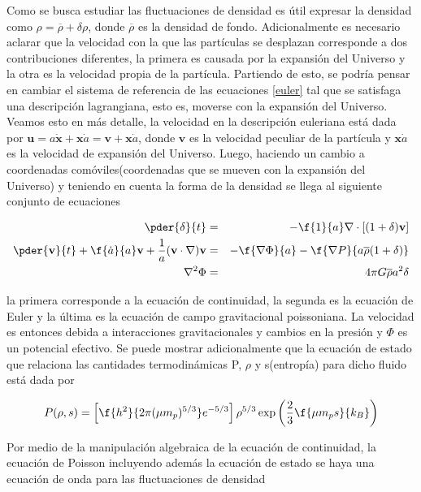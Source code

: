 Como se busca estudiar las fluctuaciones de densidad es útil expresar la 
densidad como $\rho = \overline{\rho}+\delta\rho$, donde $\overline{\rho}$
es la densidad de fondo. Adicionalmente es necesario aclarar que la velocidad 
con la que las partículas se desplazan corresponde a dos contribuciones diferentes, 
la primera es causada por la expansión del Universo y la 
otra es la velocidad propia de la partícula. Partiendo de esto, se
podría pensar en cambiar el sistema de referencia
de las ecuaciones \ref{euler} tal que se satisfaga una descripción lagrangiana, 
esto es, moverse con la expansión del Universo. 
Veamos esto en más detalle, la velocidad en la descripción euleriana está dada 
por $\textbf{u}= a\dot{\textbf{x}}+
\textbf{x}\dot{a} = \textbf{v}+\textbf{x}\dot{a}$, donde $\textbf{v}$ es la velocidad 
peculiar de la partícula y $\textbf{x}\dot{a}$ es la velocidad de expansión del Universo.
Luego, haciendo un cambio a coordenadas comóviles(coordenadas que se mueven con 
la expansión del Universo) y teniendo en cuenta la forma de la densidad se llega al
siguiente conjunto de ecuaciones

\begin{eqnarray}
\pder{\delta}{t} &=& -\f{1}{a}\nabla\cdot[(1+\delta)\textbf{v}]\nonumber\\
\pder{\textbf{v}}{t}+\f{\dot{a}}{a}\textbf{v}+\frac{1}{a}(\textbf{v}\cdot\nabla)\textbf{v}& = &
-\f{\nabla \Phi}{a}-\f{\nabla P}{a\overline{\rho}(1+\delta)}\nonumber\\
\nabla^2 \Phi &=& 4\pi G\overline{\rho}a^2\delta
\label{ec.movimiento}
\end{eqnarray}

la primera corresponde a la ecuación de continuidad, la segunda es la ecuación de 
Euler y la última es la ecuación de campo gravitacional poissoniana. La velocidad
es entonces debida a interacciones gravitacionales y cambios en la presión y $\Phi$ 
es un potencial efectivo. 
Se puede mostrar adicionalmente que la ecuación de estado que relaciona las cantidades
termodinámicas P, $\rho$ y s(entropía) para dicho fluido está dada por 

\begin{equation}
P(\rho,s)= \left[\f{h^2}{2\pi(\mu m_p)^{5/3}}e^{-5/3}\right]\rho^{5/3}\exp \left(\frac{2}{3}\f{\mu m_ps}{k_B}\right)
\label{ec.estado}
\end{equation}

Por medio de la manipulación algebraica de la ecuación de continuidad, la ecuación de Poisson 
incluyendo además la ecuación de estado se haya una ecuación de onda para las fluctuaciones de 
densidad 

